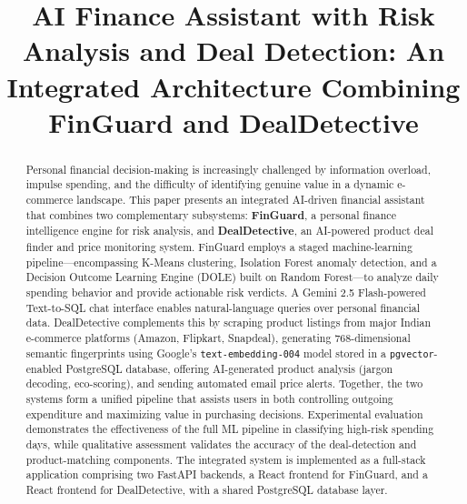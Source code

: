 \documentclass[]{IEEEtran}
\begin{document}
\title{AI Finance Assistant with Risk Analysis and Deal Detection: An Integrated Architecture Combining FinGuard and DealDetective}

\author{
}

\maketitle

\begin{abstract}
Personal financial decision-making is increasingly challenged by information overload, impulse spending, and the difficulty of identifying genuine value in a dynamic e-commerce landscape. This paper presents an integrated AI-driven financial assistant that combines two complementary subsystems: \textbf{FinGuard}, a personal finance intelligence engine for risk analysis, and \textbf{DealDetective}, an AI-powered product deal finder and price monitoring system. FinGuard employs a staged machine-learning pipeline---encompassing K-Means clustering, Isolation Forest anomaly detection, and a Decision Outcome Learning Engine (DOLE) built on Random Forest---to analyze daily spending behavior and provide actionable risk verdicts. A Gemini 2.5 Flash-powered Text-to-SQL chat interface enables natural-language queries over personal financial data. DealDetective complements this by scraping product listings from major Indian e-commerce platforms (Amazon, Flipkart, Snapdeal), generating 768-dimensional semantic fingerprints using Google's \texttt{text-embedding-004} model stored in a \texttt{pgvector}-enabled PostgreSQL database, offering AI-generated product analysis (jargon decoding, eco-scoring), and sending automated email price alerts. Together, the two systems form a unified pipeline that assists users in both controlling outgoing expenditure and maximizing value in purchasing decisions. Experimental evaluation demonstrates the effectiveness of the full ML pipeline in classifying high-risk spending days, while qualitative assessment validates the accuracy of the deal-detection and product-matching components. The integrated system is implemented as a full-stack application comprising two FastAPI backends, a React frontend for FinGuard, and a React frontend for DealDetective, with a shared PostgreSQL database layer.
\end{abstract}
\end{document}
